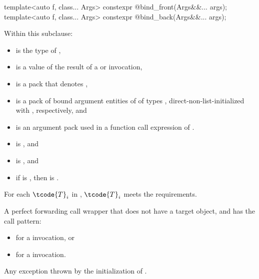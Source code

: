 %
%
\begin{itemdecl}
template<auto f, class... Args>
  constexpr @\unspec@ bind_front(Args&&... args);
template<auto f, class... Args>
  constexpr @\unspec@ bind_back(Args&&... args);
\end{itemdecl}

\begin{itemdescr}
\pnum
Within this subclause:
\begin{itemize}
\item
{} is the type of ,
\item
{} is a value of the result of
a  or  invocation,
\item
{} is a pack that denotes ,
\item
{} is a pack of bound argument entities of
 of types ,
direct-non-list-initialized with ,
respectively, and
\item
{} is an argument pack used in
a function call expression of .
\end{itemize}

\pnum
\mandates
\begin{itemize}
\item
{} is , and
\item
{} is , and
\item
if  is ,
then  is .
\end{itemize}

\pnum
\expects
For each $\tcode{T}_i$ in ,
$\tcode{T}_i$ meets the  requirements.

\pnum
\returns
A perfect forwarding call wrapper  that
does not have a target object, and has the call pattern:
\begin{itemize}
\item
{}
for a  invocation, or
\item
{}
for a  invocation.
\end{itemize}

\pnum
\throws
Any exception thrown by the initialization of .
\end{itemdescr}

